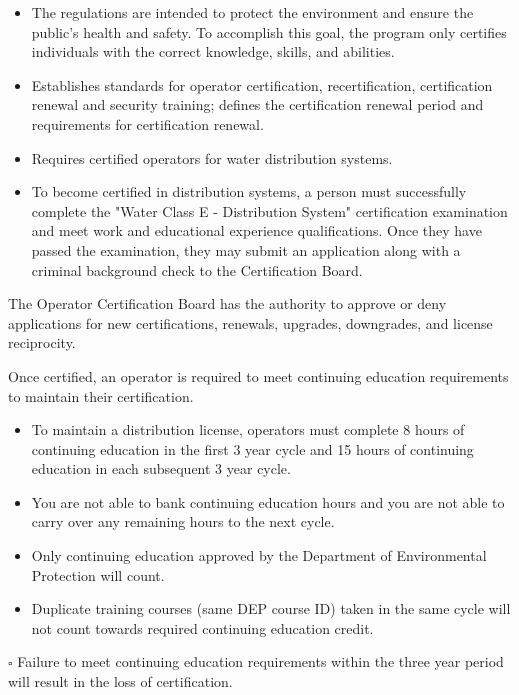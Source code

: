 \documentclass[10pt]{article}
\begin{document}
\begin{itemize}
  \item The regulations are intended to protect the environment and ensure the public's health and safety. To accomplish this goal, the program only certifies individuals with the correct knowledge, skills, and abilities.

  \item Establishes standards for operator certification, recertification, certification renewal and security training; defines the certification renewal period and requirements for certification renewal.

  \item Requires certified operators for water distribution systems.

  \item To become certified in distribution systems, a person must successfully complete the "Water Class E - Distribution System" certification examination and meet work and educational experience qualifications. Once they have passed the examination, they may submit an application along with a criminal background check to the Certification Board.

\end{itemize}
The Operator Certification Board has the authority to approve or deny applications for new certifications, renewals, upgrades, downgrades, and license reciprocity.

Once certified, an operator is required to meet continuing education requirements to maintain their certification.

\begin{itemize}
  \item To maintain a distribution license, operators must complete 8 hours of continuing education in the first 3 year cycle and 15 hours of continuing education in each subsequent 3 year cycle.

  \item You are not able to bank continuing education hours and you are not able to carry over any remaining hours to the next cycle.

  \item Only continuing education approved by the Department of Environmental Protection will count.

  \item Duplicate training courses (same DEP course ID) taken in the same cycle will not count towards required continuing education credit.

\end{itemize}
$\square$ Failure to meet continuing education requirements within the three year period will result in the loss of certification.
\end{document}
